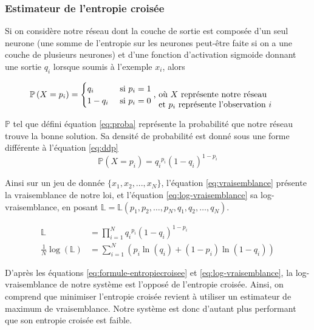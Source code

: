 \subsubsection{Estimateur de l'entropie croisée}

Si on considère notre réseau dont la couche de sortie est composée d'un seul neurone (une somme de l'entropie sur les neurones peut-être faite si 
on a une couche de plusieurs neurones) et d'une fonction d'activation sigmoide donnant une sortie $q_i$ lorsque soumis à l'exemple $x_i$, alors

\begin{equation}
 \mathbb{P}\left(X=p_i\right) = \begin{cases}q_i &\text{ si $p_i=1$}\\1-q_i &\text{ si $p_i=0$}\end{cases} \text{, \parbox[t]{15em}{où $X$ représente notre réseau\\
 et $p_i$ représente l'observation $i$}}
 \label{eq:proba}
\end{equation}

$\mathbb{P}$ tel que défini équation \ref{eq:proba} représente la probabilité que notre réseau trouve la bonne solution. Sa densité de probabilité
est donné sous une forme différente à l'équation \ref{eq:ddp}
\begin{equation}
 \label{eq:ddp}
 \mathbb{P}\left(X=p_i\right) = q_i{^{p_i}}\left(1-q_i\right)^{1-p_i}
\end{equation}

Ainsi sur un jeu de donnée $\{x_1, x_2, ..., x_N\}$, l'équation \ref{eq:vraisemblance} présente la vraisemblance de notre loi, 
et l'équation \ref{eq:log-vraisemblance} sa log-vraisemblance, en posant $\mathbb{L} = \mathbb{L}\left(p_1, p_2, \ldots, p_N, q_1, q_2, \ldots, q_N\right)$.

\begin{align}
 \mathbb{L} &= \prod_{i=1}^N q_i{^{p_i}}\left(1-q_i\right)^{1-p_i}
 \label{eq:vraisemblance}\\
 \frac{1}{N}\log\left(\mathbb{L}\right) &= \sum_{i=1}^N \left(p_i\ln\left(q_i\right) + \left(1-p_i\right)\ln\left(1-q_i\right) \right)
 \label{eq:log-vraisemblance}
\end{align}

D'après les équations \ref{eq:formule-entropiecroisee} et \ref{eq:log-vraisemblance}, la log-vraisemblance de notre système est l'opposé de l'entropie croisée. 
Ainsi, on comprend que minimiser l'entropie croisée revient à utiliser un estimateur de maximum de vraisemblance. 
Notre système est donc d'autant plus performant que son entropie croisée est faible.






